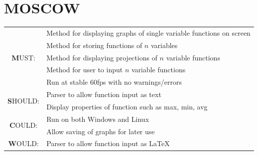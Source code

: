 \documentclass{article}
\newlength{\headerwidth}
\begin{document}
{\newpage
\section{MOSCOW}
\begin{tabularx}{\headerwidth}{|c|X|} 
	\hline
		  \multirow{5}{*}{ \textbf{M}UST: } 
		& { Method for displaying graphs of single variable functions on screen } \\
		& { Method for storing functions of $n$ variables } \\
		& { Method for displaying projections of $n$ variable functions } \\
		& { Method for user to input $n$ variable functions } \\
		& { Run at stable 60fps with no warnings/errors } \\
	\hline
		\multirow{2}{*}{ \textbf{S}HOULD: }
		& { Parser to allow function input as text } \\
		& { Display properties of function such as max, min, avg } \\
	\hline
		\multirow{2}{*}{ \textbf{C}OULD: }
		& { Run on both Windows and Linux } \\
		& { Allow saving of graphs for later use } \\
	\hline
		\multirow{1}{*}{ \textbf{W}OULD: }
		& { Parser to allow function input as \LaTeX } \\
	\hline
\end{tabularx}

} 
\end{document}
